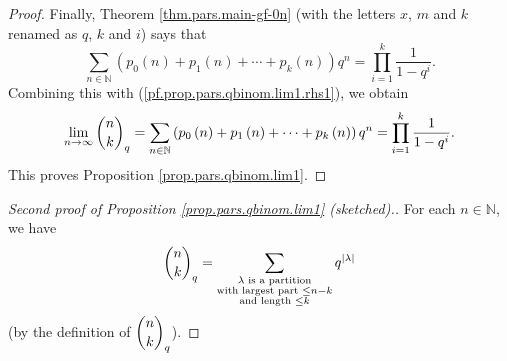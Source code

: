 \begin{proof}
Finally, Theorem \ref{thm.pars.main-gf-0n} (with the letters $x$, $m$ and $k$
renamed as $q$, $k$ and $i$) says that%
\[
\sum_{n\in\mathbb{N}}\left(  p_{0}\left(  n\right)  +p_{1}\left(  n\right)
+\cdots+p_{k}\left(  n\right)  \right)  q^{n}=\prod_{i=1}^{k}\dfrac{1}%
{1-q^{i}}.
\]
Combining this with (\ref{pf.prop.pars.qbinom.lim1.rhs1}), we obtain%
\[
\lim\limits_{n\rightarrow\infty}\dbinom{n}{k}_{q}=\sum_{n\in\mathbb{N}}\left(
p_{0}\left(  n\right)  +p_{1}\left(  n\right)  +\cdots+p_{k}\left(  n\right)
\right)  q^{n}=\prod_{i=1}^{k}\dfrac{1}{1-q^{i}}.
\]
This proves Proposition \ref{prop.pars.qbinom.lim1}.
\end{proof}

\begin{proof}
[Second proof of Proposition \ref{prop.pars.qbinom.lim1} (sketched).]For each
$n\in\mathbb{N}$, we have%
\begin{equation}
\dbinom{n}{k}_{q}=\sum_{\substack{\lambda\text{ is a partition}\\\text{with
largest part }\leq n-k\\\text{and length }\leq k}}q^{\left\vert \lambda
\right\vert } \label{pf.prop.pars.qbinom.lim1.2nd.1}%
\end{equation}
(by the definition of $\dbinom{n}{k}_{q}$).


\end{proof}
